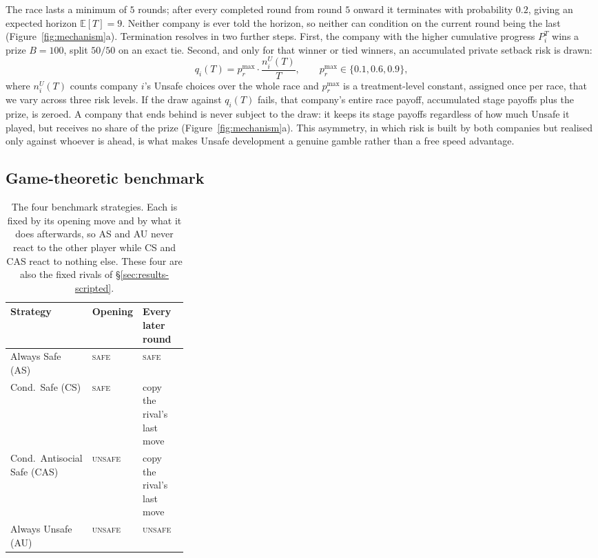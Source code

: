 \documentclass{article}
\newcommand{\Safe}{\textsc{safe}}
\newcommand{\Unsafe}{\textsc{unsafe}}
\begin{document}
The race lasts a minimum of $5$ rounds; after every completed round from round $5$ onward it terminates with probability $0.2$, giving an expected horizon $\mathbb{E}[T]=9$. Neither company is ever told the horizon, so neither can condition on the current round being the last (Figure~\ref{fig:mechanism}a). Termination resolves in two further steps. First, the company with the higher cumulative progress $P_i^T$ wins a prize $B=100$, split $50/50$ on an exact tie. Second, and only for that winner or tied winners, an accumulated private setback risk is drawn:
\begin{equation}
    q_i(T) = p_r^{\max} \cdot \frac{n_i^U(T)}{T},\qquad p_r^{\max}\in\{0.1,0.6,0.9\},
    \label{eq:risk}
\end{equation}
where $n_i^U(T)$ counts company $i$'s Unsafe choices over the whole race and $p_r^{\max}$ is a treatment-level constant, assigned once per race, that we vary across three risk levels. If the draw against $q_i(T)$ fails, that company's entire race payoff, accumulated stage payoffs plus the prize, is zeroed. A company that ends behind is never subject to the draw: it keeps its stage payoffs regardless of how much Unsafe it played, but receives no share of the prize (Figure~\ref{fig:mechanism}a). This asymmetry, in which risk is built by both companies but realised only against whoever is ahead, is what makes Unsafe development a genuine gamble rather than a free speed advantage.

\subsection{Game-theoretic benchmark}
\label{sec:theory-benchmark}

\begin{table}[t]
\caption{The four benchmark strategies. Each is fixed by its opening move and
by what it does afterwards, so AS and AU never react to the other player while
CS and CAS react to nothing else. These four are also the fixed rivals of
\S\ref{sec:results-scripted}.}
\label{tab:benchmark-strategies}
\centering
\footnotesize
\setlength{\tabcolsep}{3pt}
\begin{tabular}{@{}llp{0.30\linewidth}@{}}
\toprule
Strategy & Opening & Every later round \\
\midrule
Always Safe (AS) & \Safe{} & \Safe{} \\
Cond.\ Safe (CS) & \Safe{} & copy the rival's last move \\
Cond.\ Antisocial Safe (CAS) & \Unsafe{} & copy the rival's last move \\
Always Unsafe (AU) & \Unsafe{} & \Unsafe{} \\
\bottomrule
\end{tabular}
\end{table}
\end{document}
